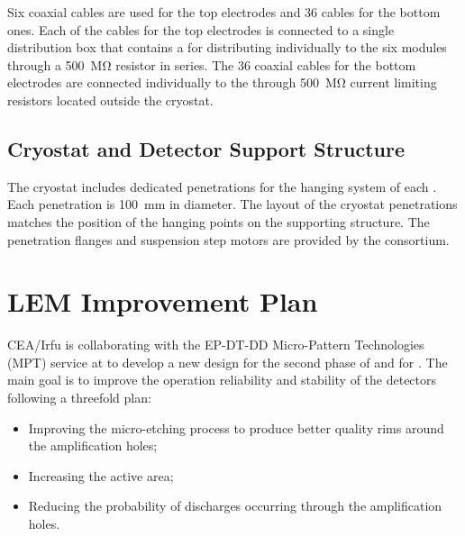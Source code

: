 Six coaxial cables are used for the top  electrodes and \num{36} cables for the bottom ones. Each of the cables for the top  electrodes is connected to a single distribution box that contains a  for distributing  individually to the six  modules through a \SI{500}{\mega\ohm} resistor in series. The \num{36} coaxial cables for the bottom  electrodes are connected individually to the  through \SI{500}{\mega\ohm} current limiting resistors located outside the cryostat.

\subsection{Cryostat and Detector Support Structure}
\label{sec:dp-crp-intfc-support}

The cryostat includes dedicated penetrations for the hanging system of each . Each penetration is \SI{100}{mm} in diameter. The layout of the cryostat penetrations matches the position of the hanging points on the  supporting structure. The penetration flanges and  suspension step motors are provided by the  consortium.

\section{LEM Improvement Plan}
\label{sec:dp-lem-ip}

CEA/Irfu is collaborating with the EP-DT-DD Micro-Pattern Technologies (MPT) service at  to develop a 
new  design for the second phase of  and for . The main goal is to improve the operation reliability and stability of the  detectors following a threefold plan:
\begin{itemize}
\item Improving the micro-etching process to produce better quality rims around the amplification holes;  
\item Increasing the  active area;
\item Reducing the probability of discharges occurring through the amplification holes.
\end{itemize}

